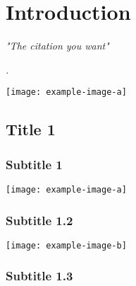 \chapter[\textcolor{darkblue}{Introduction}]{Introduction}


\parbox[c][5cm][c]{9cm}{

\vspace*{4cm}
\textit{\hspace{2.5cm} "The citation you want"}

\begin{tBox}

\textit{\large
\lipsum[1].}
\vspace*{0.2cm}

\textit{\large
\lipsum[2]} 

\end{tBox}
\vspace*{0.2cm}
}

\vspace*{9cm}

\begin{minipage}[c][5cm][c]{9cm}
\centering
\texttt{[image: example-image-a]}
\label{fig:aim}
\end{minipage}

\clearpage

\section{Title 1}


\subsection[Subtitle 1.1 in the toc]{Subtitle 1}

\lipsum[1-3]

\centerline{\texttt{[image: example-image-a]}}

\subsection[Subtitle 1.2 in the toc]{Subtitle 1.2}

\lipsum[1-3]

\centerline{{
\texttt{[image: example-image-b]}}}

\subsection[Subtitle 1.3 in the toc]{Subtitle 1.3}
\lipsum[1-3]

